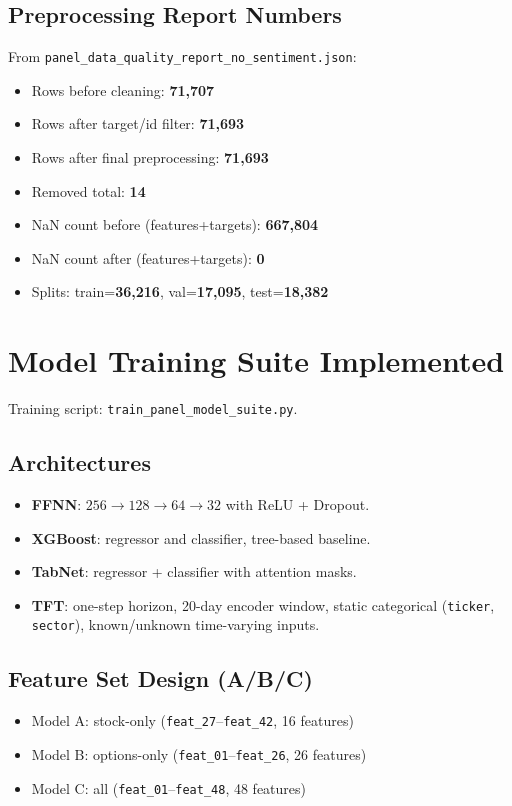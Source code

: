 \documentclass[11pt]{article}
\begin{document}
\subsection{Preprocessing Report Numbers}
From \texttt{panel\_data\_quality\_report\_no\_sentiment.json}:
\begin{itemize}[leftmargin=1.2em]
  \item Rows before cleaning: \textbf{71,707}
  \item Rows after target/id filter: \textbf{71,693}
  \item Rows after final preprocessing: \textbf{71,693}
  \item Removed total: \textbf{14}
  \item NaN count before (features+targets): \textbf{667,804}
  \item NaN count after (features+targets): \textbf{0}
  \item Splits: train=\textbf{36,216}, val=\textbf{17,095}, test=\textbf{18,382}
\end{itemize}

\section{Model Training Suite Implemented}
Training script: \texttt{train\_panel\_model\_suite.py}.

\subsection{Architectures}
\begin{itemize}[leftmargin=1.2em]
  \item \textbf{FFNN}: $256 \rightarrow 128 \rightarrow 64 \rightarrow 32$ with ReLU + Dropout.
  \item \textbf{XGBoost}: regressor and classifier, tree-based baseline.
  \item \textbf{TabNet}: regressor + classifier with attention masks.
  \item \textbf{TFT}: one-step horizon, 20-day encoder window, static categorical (\texttt{ticker}, \texttt{sector}), known/unknown time-varying inputs.
\end{itemize}

\subsection{Feature Set Design (A/B/C)}
\begin{itemize}[leftmargin=1.2em]
  \item Model A: stock-only (\texttt{feat\_27}--\texttt{feat\_42}, 16 features)
  \item Model B: options-only (\texttt{feat\_01}--\texttt{feat\_26}, 26 features)
  \item Model C: all (\texttt{feat\_01}--\texttt{feat\_48}, 48 features)
\end{itemize}
\end{document}

